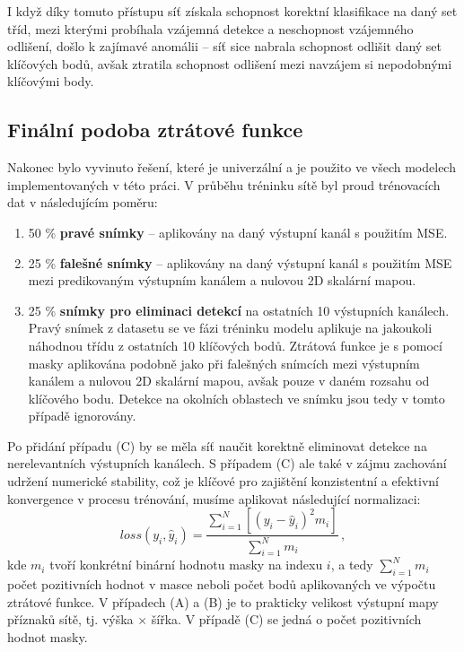 I když díky tomuto přístupu síť získala schopnost korektní klasifikace na daný set tříd, mezi kterými probíhala vzájemná detekce a neschopnost vzájemného odlišení, došlo k zajímavé anomálii -- síť sice nabrala schopnost odlišit daný set klíčových bodů, avšak ztratila schopnost odlišení mezi navzájem si nepodobnými klíčovými body.

\subsection{Finální podoba ztrátové funkce}
\label{subsec:Chapter473_final_loss}

Nakonec bylo vyvinuto řešení, které je univerzální a je použito ve všech modelech implementovaných v této práci. V průběhu tréninku sítě byl proud trénovacích dat v následujícím poměru:
\begin{enumerate}[label=(\Alph*)]
    \item 50 \% \textbf{pravé snímky} -- aplikovány na daný výstupní kanál s použitím MSE.
    \item 25 \% \textbf{falešné snímky} -- aplikovány na daný výstupní kanál s použitím MSE mezi predikovaným výstupním kanálem a nulovou 2D skalární mapou.
    \item 25 \% \textbf{snímky pro eliminaci detekcí} na ostatních 10 výstupních kanálech. Pravý snímek z datasetu se ve fázi tréninku modelu aplikuje na jakoukoli náhodnou třídu z ostatních 10 klíčových bodů. Ztrátová funkce je s pomocí masky aplikována podobně jako při falešných snímcích mezi výstupním kanálem a nulovou 2D skalární mapou, avšak pouze v daném rozsahu od klíčového bodu. Detekce na okolních oblastech ve snímku jsou tedy v tomto případě ignorovány.
\end{enumerate}
Po přidání případu (C) by se měla síť naučit korektně eliminovat detekce na nerelevantních výstupních kanálech. S případem (C) ale také v zájmu zachování udržení numerické stability, což je klíčové pro zajištění konzistentní a efektivní konvergence v procesu trénování, musíme aplikovat následující normalizaci:
\begin{equation}
loss(y_i, \hat{y}_i) = \frac{\sum_{i=1}^{N} [ (y_i - \hat{y}_i)^2 m_i ]}{\sum_{i=1}^{N} m_i}\,,
\end{equation}
kde $m_i$ tvoří konkrétní binární hodnotu masky na indexu $i$, a tedy $\sum_{i=1}^{N} m_i$ počet pozitivních hodnot v masce neboli počet bodů aplikovaných ve výpočtu ztrátové funkce. V případech (A) a (B) je to prakticky velikost výstupní mapy příznaků sítě, tj. výška $\times$ šířka. V případě (C) se jedná o počet pozitivních hodnot masky.


